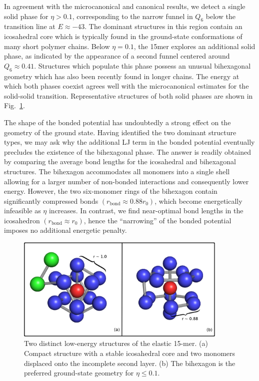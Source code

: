 \documentclass[12pt]{report}
\begin{document}
%
In agreement with the microcanonical and canonical results, we detect
a single solid phase for $\eta > 0.1$, corresponding to the narrow funnel
in $Q_{6}$ below the transition line at $E \approx -43$. The dominant
structures in this region contain an icosahedral core which is typically
found in the ground-state conformations of many short polymer chains.
Below $\eta = 0.1$, the 15mer explores an additional solid phase, as
indicated by the appearance of a second funnel centered around $Q_{6}
\approx 0.41$. Structures which populate this phase possess an unusual
bihexagonal geometry which has also been recently found in longer chains.
The energy at which both phases coexist agrees well with the microcanonical
estimates for the solid-solid transition. Representative structures of both
solid phases are shown in Fig.~\ref{Structures}.

The shape of the bonded potential has undoubtedly a strong effect on
the geometry of the ground state. Having identified the two dominant
structure types, we may ask why the additional LJ term in the bonded
potential eventually precludes the existence of the bihexagonal phase. The
answer is readily obtained by comparing the average bond lengths for the
icosahedral and bihexagonal structures. The bihexagon accommodates all
monomers into a single shell allowing for a larger number of non-bonded
interactions and consequently lower energy. However, the two six-monomer
rings of the bihexagon contain significantly compressed bonds
$(r_{\mathrm{bond}} \approx 0.88 r_{0})$, which become energetically
infeasible as $\eta$ increases. In contrast, we find near-optimal bond
lengths in the icosahedron $(r_{\mathrm{bond}} \approx  r_{0})$, hence the
``narrowing'' of the bonded potential imposes no additional energetic
penalty.
%
\begin{figure}
\center
	\includegraphics[width=0.9\textwidth]{chapter6Figs/configurations.eps}				        
	\caption{\label{Structures} Two distinct low-energy structures of
the elastic 15-mer. (a) Compact structure with a stable icosahedral core
and two monomers displaced onto the incomplete second layer. (b) The
bihexagon is the preferred ground-state geometry for $\eta \leq 0.1$.}
\end{figure}
%
\end{document}
